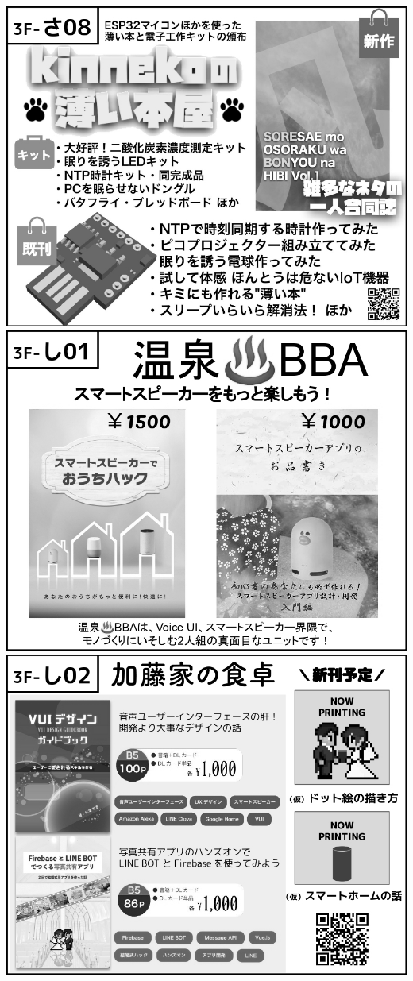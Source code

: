 \begin{center}
\includegraphics[width=0.9\linewidth]{images/circle-appeals/3F-さ08.jpg}
\includegraphics[width=0.9\linewidth]{images/circle-appeals/3F-し01.jpg}
\includegraphics[width=0.9\linewidth]{images/circle-appeals/3F-し02.jpg}

\end{center}
